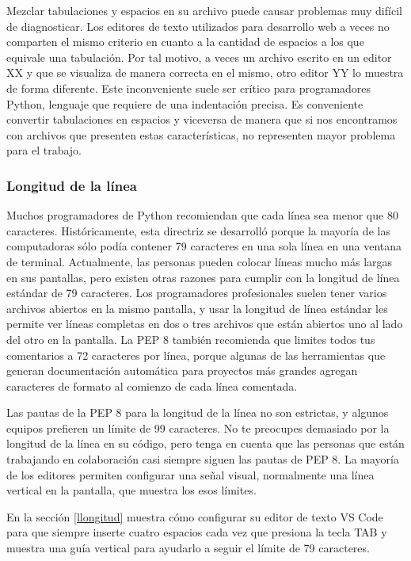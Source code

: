Mezclar tabulaciones y espacios en su archivo puede causar problemas muy
difícil de diagnosticar. Los editores de texto utilizados para desarrollo web a veces no comparten el mismo criterio en cuanto a la cantidad de espacios a los que equivale una tabulación. Por tal motivo, a veces un archivo escrito en un editor XX y que se visualiza de manera correcta en el mismo, otro editor YY lo muestra de forma diferente. Este inconveniente suele ser crítico para programadores Python, lenguaje que requiere de una indentación precisa. Es conveniente convertir tabulaciones en espacios y viceversa de manera que si nos encontramos con archivos que presenten estas características, no representen mayor problema para el trabajo.




\subsubsection{Longitud de la línea}

Muchos programadores de Python recomiendan que cada línea sea menor que
80 caracteres. Históricamente, esta directriz se desarrolló porque la mayoría de las computadoras
sólo podía contener 79 caracteres en una sola línea en una ventana de terminal. Actualmente, las personas
pueden colocar líneas mucho más largas en sus pantallas, pero existen  otras razones
para cumplir con la longitud de línea estándar de 79 caracteres. Los programadores profesionales suelen tener varios archivos abiertos en la mismo pantalla, y usar la longitud de línea estándar les permite ver líneas completas
en dos o tres archivos que están abiertos uno al lado del otro en la pantalla. La PEP 8 también recomienda
que limites todos tus comentarios a 72 caracteres por línea, porque algunas de las herramientas que generan documentación automática para proyectos más grandes agregan caracteres de formato al comienzo de cada
línea comentada.

Las pautas de la PEP 8 para la longitud de la línea no son estrictas, y algunos equipos prefieren un límite de 99 caracteres. 
No te preocupes demasiado por la longitud de la línea en su código,  pero tenga en cuenta que las personas que están trabajando
en colaboración casi siempre siguen las pautas de PEP 8. 
La mayoría de los editores permiten configurar una señal visual, normalmente una línea vertical en la pantalla, que muestra
los esos límites.


En la sección \ref{llongitud}  muestra cómo configurar su editor de texto VS Code para que siempre inserte cuatro
espacios cada vez que presiona la tecla TAB y muestra una guía vertical para ayudarlo a seguir el límite de 79 caracteres.


